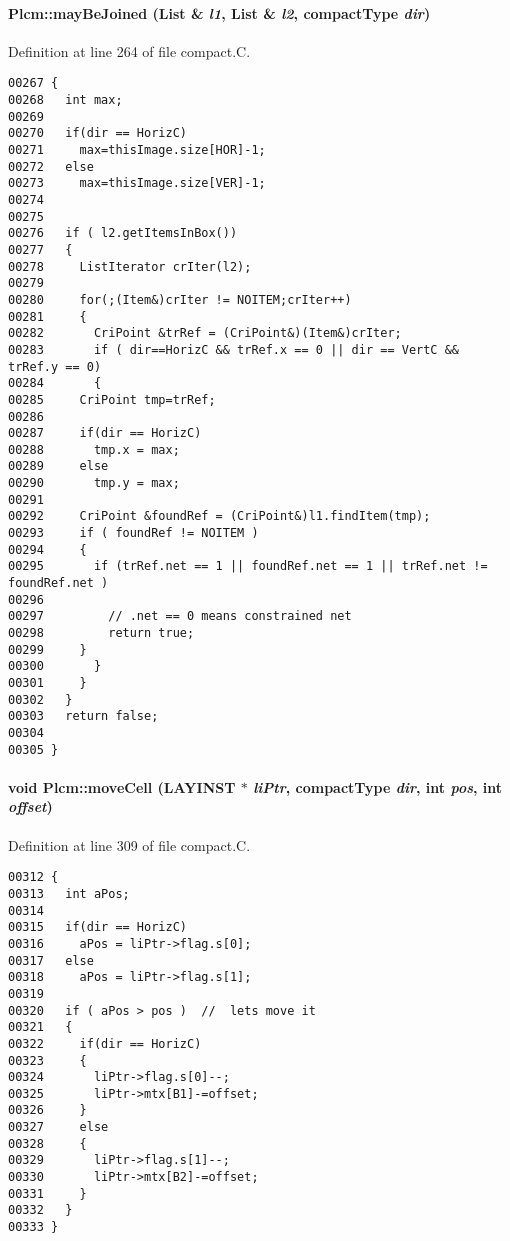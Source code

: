 \label{Plcm_c21}
\paragraph{ Plcm::may\-Be\-Joined ({\bf List} \& {\em l1}, {\bf List} \& {\em l2}, {\bf compact\-Type} {\em dir})\hspace{0.3cm}{\tt  [private]}}\hfill



Definition at line 264 of file compact.C.\small\begin{verbatim}00267 {
00268   int max;
00269 
00270   if(dir == HorizC)
00271     max=thisImage.size[HOR]-1;
00272   else
00273     max=thisImage.size[VER]-1;    
00274   
00275   
00276   if ( l2.getItemsInBox())
00277   {  
00278     ListIterator crIter(l2);
00279     
00280     for(;(Item&)crIter != NOITEM;crIter++)
00281     {
00282       CriPoint &trRef = (CriPoint&)(Item&)crIter;
00283       if ( dir==HorizC && trRef.x == 0 || dir == VertC && trRef.y == 0)
00284       {
00285     CriPoint tmp=trRef;
00286     
00287     if(dir == HorizC)
00288       tmp.x = max;
00289     else
00290       tmp.y = max;
00291     
00292     CriPoint &foundRef = (CriPoint&)l1.findItem(tmp);
00293     if ( foundRef != NOITEM )
00294     {
00295       if (trRef.net == 1 || foundRef.net == 1 || trRef.net != foundRef.net )
00296         
00297         // .net == 0 means constrained net
00298         return true;
00299     }
00300       }
00301     }
00302   }
00303   return false;
00304 
00305 }
\end{verbatim}\normalsize 
\label{Plcm_c22}
\paragraph{\setlength{\rightskip}{0pt plus 5cm}void Plcm::move\-Cell (LAYINST $\ast$ {\em li\-Ptr}, {\bf compact\-Type} {\em dir}, int {\em pos}, int {\em offset})\hspace{0.3cm}{\tt  [private]}}\hfill



Definition at line 309 of file compact.C.\small\begin{verbatim}00312 {
00313   int aPos;
00314 
00315   if(dir == HorizC)
00316     aPos = liPtr->flag.s[0];
00317   else
00318     aPos = liPtr->flag.s[1];
00319   
00320   if ( aPos > pos )  //  lets move it
00321   {
00322     if(dir == HorizC)
00323     {
00324       liPtr->flag.s[0]--;   
00325       liPtr->mtx[B1]-=offset;   
00326     }
00327     else
00328     {
00329       liPtr->flag.s[1]--;
00330       liPtr->mtx[B2]-=offset;   
00331     }
00332   }
00333 }
\end{verbatim}\normalsize 
\label{Plcm_c18}
